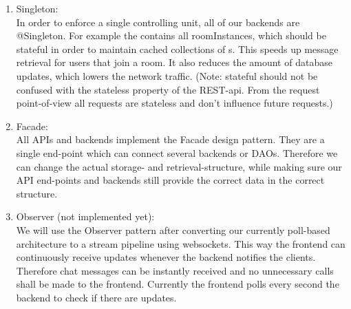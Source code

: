 \begin{enumerate}
\item Singleton:\\
In order to enforce a single controlling unit, all of our backends \cite{backend} are @Singleton.
For example the  contains all roomInstances, which should be stateful in order to maintain cached collections of s.
This speeds up message retrieval for users that join a room.
It also reduces the amount of database updates, which lowers the network traffic.
(Note: stateful should not be confused with the stateless property of the REST-api.
From the request point-of-view all requests are stateless and don't influence future requests.)

\item Facade:\\
All APIs and backends implement the Facade design pattern.
They are a single end-point which can connect several backends or DAOs.
Therefore we can change the actual storage- and retrieval-structure, while making sure our API end-points and backends still provide the correct data in the correct structure.

\item Observer (not implemented yet):\\
We will use the Observer pattern after converting our currently poll-based architecture to a stream pipeline using websockets.
This way the frontend can continuously receive updates whenever the backend notifies the clients.
Therefore chat messages can be instantly received and no unnecessary calls shall be made to the frontend.
Currently the frontend polls every second the backend to check if there are updates.
\end{enumerate}